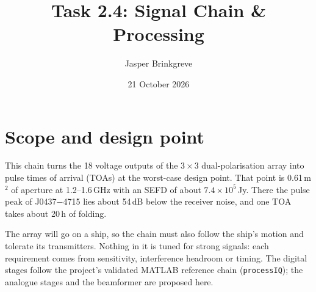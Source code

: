 \documentclass[11pt,a4paper]{article}
\title{Task 2.4: Signal Chain \& Processing}
\author{Jasper Brinkgreve}
\date{21 October 2026}
\begin{document}
\maketitle

\section{Scope and design point}

This chain turns the 18 voltage outputs of the $3\times3$ dual-polarisation array into pulse times of
arrival (TOAs) at the worst-case design point. That point is 0.61\,m$^2$ of aperture at 1.2--1.6\,GHz
with an SEFD of about $7.4\times10^{5}$\,Jy. There the pulse peak of J0437$-$4715 lies about 54\,dB
below the receiver noise, and one TOA takes about 20\,h of folding.

The array will go on a ship, so the chain must also follow the ship's motion and tolerate its
transmitters. Nothing in it is tuned for strong signals: each requirement comes from sensitivity,
interference headroom or timing. The digital stages follow the project's validated MATLAB reference
chain (\texttt{processIQ}); the analogue stages and the beamformer are proposed here.
\end{document}
